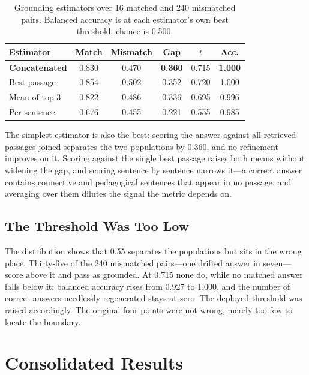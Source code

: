 \documentclass[conference]{IEEEtran}
\begin{document}
\begin{table}[htbp]
\caption{Grounding estimators over 16 matched and 240 mismatched pairs. Balanced accuracy is at each estimator's own best threshold; chance is 0.500.}
\label{tab:estimators}
\centering
\footnotesize
\setlength{\tabcolsep}{4pt}
\begin{tabular}{@{}lccccc@{}}
\toprule
\textbf{Estimator} & \textbf{Match} & \textbf{Mismatch} & \textbf{Gap} & \textbf{$t$} & \textbf{Acc.} \\
\midrule
\textbf{Concatenated} & 0.830 & 0.470 & \textbf{0.360} & 0.715 & \textbf{1.000} \\
Best passage & 0.854 & 0.502 & 0.352 & 0.720 & 1.000 \\
Mean of top 3 & 0.822 & 0.486 & 0.336 & 0.695 & 0.996 \\
Per sentence & 0.676 & 0.455 & 0.221 & 0.555 & 0.985 \\
\bottomrule
\end{tabular}
\end{table}

The simplest estimator is also the best: scoring the answer against all retrieved passages joined separates the two populations by 0.360, and no refinement improves on it. Scoring against the single best passage raises both means without widening the gap, and scoring sentence by sentence narrows it---a correct answer contains connective and pedagogical sentences that appear in no passage, and averaging over them dilutes the signal the metric depends on.

\subsection{The Threshold Was Too Low}
The distribution shows that 0.55 separates the populations but sits in the wrong place. Thirty-five of the 240 mismatched pairs---one drifted answer in seven---score above it and pass as grounded. At 0.715 none do, while no matched answer falls below it: balanced accuracy rises from 0.927 to 1.000, and the number of correct answers needlessly regenerated stays at zero. The deployed threshold was raised accordingly. The original four points were not wrong, merely too few to locate the boundary.

\section{Consolidated Results}
\end{document}
